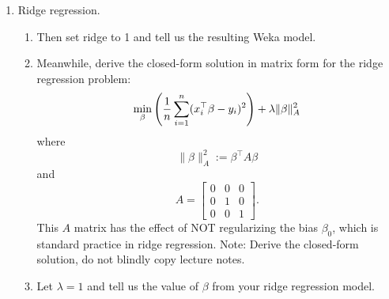 \documentclass[a4paper]{article}
\theoremstyle{definition}
\begin{document}
\begin{enumerate}
\item Ridge regression.
\begin{enumerate}
\item
Then set ridge to 1 and tell us the resulting Weka model.
\item
Meanwhile, derive the closed-form solution in matrix form for the ridge regression problem:
$$\min_\beta \left({1\over n} \sum_{i=1}^n (x_i^\top \beta - y_i)^2 \right) + \lambda \|\beta\|_A^2$$
where 
$$\|\beta\|_A^2 := \beta^\top A \beta$$
and
$$A=
\begin{bmatrix}
0 & 0 & 0 \\
0 & 1 & 0 \\
0 & 0 & 1
\end{bmatrix}.$$
This $A$ matrix has the effect of NOT regularizing the bias $\beta_0$, which is standard practice in ridge regression.
Note: Derive the closed-form solution, do not blindly copy lecture notes.
\item
Let $\lambda=1$ and tell us the value of $\beta$ from your ridge regression model.
\end{enumerate}

\end{enumerate}
\end{document}
